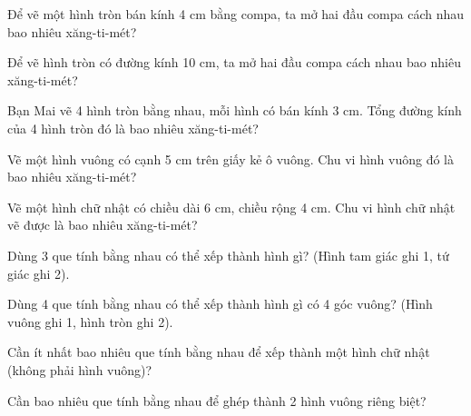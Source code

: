\begin{ex}
Để vẽ một hình tròn bán kính 4 cm bằng compa, ta mở hai đầu compa cách nhau bao nhiêu xăng-ti-mét?
\end{ex}

\begin{ex}
Để vẽ hình tròn có đường kính 10 cm, ta mở hai đầu compa cách nhau bao nhiêu xăng-ti-mét?
\end{ex}

\begin{ex}
Bạn Mai vẽ 4 hình tròn bằng nhau, mỗi hình có bán kính 3 cm. Tổng đường kính của 4 hình tròn đó là bao nhiêu xăng-ti-mét?
\end{ex}

\begin{ex}
Vẽ một hình vuông có cạnh 5 cm trên giấy kẻ ô vuông. Chu vi hình vuông đó là bao nhiêu xăng-ti-mét?
\end{ex}

\begin{ex}
Vẽ một hình chữ nhật có chiều dài 6 cm, chiều rộng 4 cm. Chu vi hình chữ nhật vẽ được là bao nhiêu xăng-ti-mét?
\end{ex}

\begin{ex}
Dùng 3 que tính bằng nhau có thể xếp thành hình gì? (Hình tam giác ghi 1, tứ giác ghi 2).
\end{ex}

\begin{ex}
Dùng 4 que tính bằng nhau có thể xếp thành hình gì có 4 góc vuông? (Hình vuông ghi 1, hình tròn ghi 2).
\end{ex}

\begin{ex}
Cần ít nhất bao nhiêu que tính bằng nhau để xếp thành một hình chữ nhật (không phải hình vuông)?
\end{ex}

\begin{ex}
Cần bao nhiêu que tính bằng nhau để ghép thành 2 hình vuông riêng biệt?
\end{ex}

